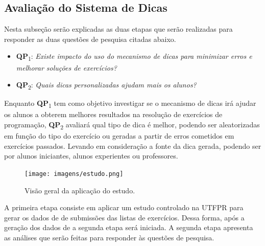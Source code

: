 \subsection{Avaliação do Sistema de Dicas}

Nesta subseção serão explicadas as duas etapas que serão realizadas para responder as duas questões de pesquisa citadas abaixo.

\begin{itemize}
	\item \textbf{QP}\textsubscript{1}: 
	\textit{Existe impacto do uso do mecanismo de dicas para minimizar erros e melhorar soluções de exercícios?}
	\item \textbf{QP}\textsubscript{2}: 
	\textit{Quais dicas personalizadas ajudam mais os alunos?}
\end{itemize}

Enquanto \textbf{QP}\textsubscript{1} tem como objetivo investigar se o mecanismo de dicas irá ajudar os alunos a obterem melhores resultados na resolução de exercícios de programação, \textbf{QP}\textsubscript{2} avaliará qual tipo de dica é melhor, podendo ser aleatorizadas em função do tipo do exercício ou geradas a partir de erros cometidos em exercícios passados. Levando em consideração a fonte da dica gerada, podendo ser por alunos iniciantes, alunos experientes ou professores.

\begin{figure}[]
	\centering
	\captionsetup{justification=centering}
	\texttt{[image: imagens/estudo.png]}
	\caption{Visão geral da aplicação do estudo.}
	\label{figura:estudo}
\end{figure}

A primeira etapa consiste em aplicar um estudo controlado na UTFPR para gerar os dados de  de submissões das listas de exercícios. Dessa forma, após a geração dos dados de  a segunda etapa será iniciada. A segunda etapa apresenta as análises que serão feitas para responder às questões de pesquisa.

